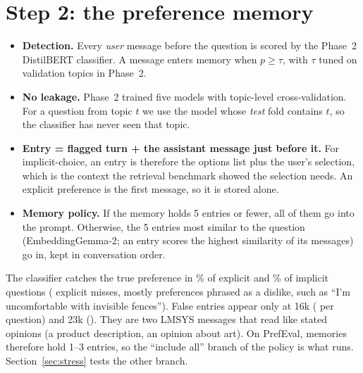 \documentclass[11pt,a4paper]{article}
\begin{document}
\section{Step 2: the preference memory}\label{sec:memory}
\begin{itemize}
  \item \textbf{Detection.} Every \emph{user} message before the question is scored by the Phase~2 DistilBERT classifier. A message enters memory
        when $p \geq \tau$, with $\tau$ tuned on validation topics in Phase~2.
  \item \textbf{No leakage.} Phase~2 trained five models with topic-level cross-validation. For a question from topic $t$ we use the model whose
        \emph{test} fold contains $t$, so the classifier has never seen that topic.
  \item \textbf{Entry = flagged turn + the assistant message just before it.} For implicit-choice, an entry is therefore the options list plus the
        user's selection, which is the context the retrieval benchmark showed the selection needs. An explicit preference is the first message,
        so it is stored alone.
  \item \textbf{Memory policy.} If the memory holds 5 entries or fewer, all of them go into the prompt. Otherwise, the 5 entries most similar
        to the question (EmbeddingGemma-2; an entry scores the highest similarity of its messages) go in, kept in conversation order.
\end{itemize}

\begin{table}[H]
\centering\small
\resizebox{\linewidth}{!}{}
\caption{Memory quality (1{,}000 questions per cell). False entries come only from LMSYS messages, and only once the conversation reaches 16k tokens.}
\label{tab:memory}
\end{table}

The classifier catches the true preference in \qMemEx\% of explicit and \qMemIm\% of implicit questions (\qMissedEx{} explicit misses,
mostly preferences phrased as a dislike, such as ``I'm uncomfortable with invisible fences''). False entries appear only at 16k (\qFalseSixteen{} per
question) and 23k (\qFalseTwentyThree). They are two LMSYS messages that read like stated opinions (a product description, an opinion about art).
On PrefEval, memories therefore hold 1--3 entries, so the ``include all'' branch of the policy is what runs. Section~\ref{sec:stress} tests the other branch.
\end{document}
